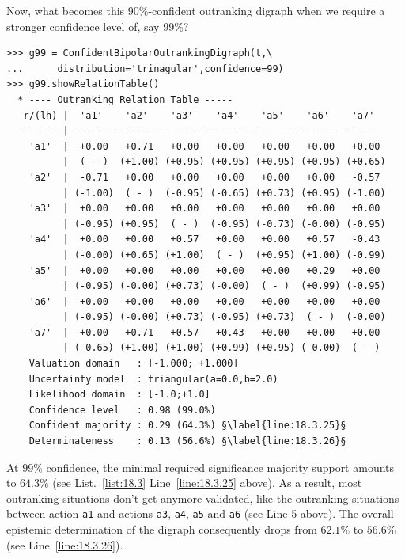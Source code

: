 Now, what becomes this $90\%$-confident outranking digraph when we require a stronger confidence level of, say $99\%$?
\begin{lstlisting}[caption={$99\%$-confident outranking relation},label=list:18.3,basicstyle=\ttfamily\scriptsize]
>>> g99 = ConfidentBipolarOutrankingDigraph(t,\
...      distribution='trinagular',confidence=99)
>>> g99.showRelationTable()
  * ---- Outranking Relation Table -----
   r/(lh) |  'a1'    'a2'    'a3'    'a4'    'a5'    'a6'    'a7'	 
   -------|------------------------------------------------------
    'a1'  |  +0.00   +0.71   +0.00   +0.00   +0.00   +0.00   +0.00  
          |  ( - )  (+1.00) (+0.95) (+0.95) (+0.95) (+0.95) (+0.65) 
    'a2'  |  -0.71   +0.00   +0.00   +0.00   +0.00   +0.00   -0.57  
          | (-1.00)  ( - )  (-0.95) (-0.65) (+0.73) (+0.95) (-1.00) 
    'a3'  |  +0.00   +0.00   +0.00   +0.00   +0.00   +0.00   +0.00  
          | (-0.95) (+0.95)  ( - )  (-0.95) (-0.73) (-0.00) (-0.95) 
    'a4'  |  +0.00   +0.00   +0.57   +0.00   +0.00   +0.57   -0.43  
          | (-0.00) (+0.65) (+1.00)  ( - )  (+0.95) (+1.00) (-0.99) 
    'a5'  |  +0.00   +0.00   +0.00   +0.00   +0.00   +0.29   +0.00  
          | (-0.95) (-0.00) (+0.73) (-0.00)  ( - )  (+0.99) (-0.95) 
    'a6'  |  +0.00   +0.00   +0.00   +0.00   +0.00   +0.00   +0.00  
          | (-0.95) (-0.00) (+0.73) (-0.95) (+0.73)  ( - )  (-0.00) 
    'a7'  |  +0.00   +0.71   +0.57   +0.43   +0.00   +0.00   +0.00  
          | (-0.65) (+1.00) (+1.00) (+0.99) (+0.95) (-0.00)  ( - )  
    Valuation domain   : [-1.000; +1.000] 
    Uncertainty model  : triangular(a=0.0,b=2.0) 
    Likelihood domain  : [-1.0;+1.0] 
    Confidence level   : 0.98 (99.0%) 
    Confident majority : 0.29 (64.3%) §\label{line:18.3.25}§
    Determinateness    : 0.13 (56.6%) §\label{line:18.3.26}§
\end{lstlisting}

At $99\%$ confidence, the minimal required significance majority support amounts to $64.3\%$ (see List.~\ref{list:18.3} Line~\ref{line:18.3.25} above). As a result, most outranking situations don't get anymore validated, like the outranking situations between action \texttt{a1} and actions \texttt{a3}, \texttt{a4}, \texttt{a5} and \texttt{a6} (see Line 5 above). The overall epistemic determination of the digraph consequently drops from $62.1\%$ to $56.6\%$ (see Line~\ref{line:18.3.26}).

